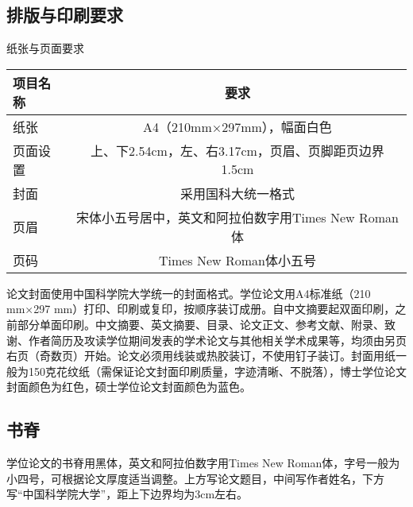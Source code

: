 \subsection{排版与印刷要求}
纸张与页面要求
\begin{center}
    \begin{tabular}{lc}
        \hline
        项目名称 & 要求\\
        \hline
        纸张&A4（210mm×297mm），幅面白色\\
        页面设置&上、下2.54cm，左、右3.17cm，页眉、页脚距页边界1.5cm\\
        封面&采用国科大统一格式\\
        页眉&宋体小五号居中，英文和阿拉伯数字用Times New Roman体\\
        页码&Times New Roman体小五号 \\

        \hline
    \end{tabular}
\end{center}
论文封面使用中国科学院大学统一的封面格式。学位论文用A4标准纸（210 mm×297 mm）打印、印刷或复印，按顺序装订成册。自中文摘要起双面印刷，之前部分单面印刷。中文摘要、英文摘要、目录、论文正文、参考文献、附录、致谢、作者简历及攻读学位期间发表的学术论文与其他相关学术成果等，均须由另页右页（奇数页）开始。论文必须用线装或热胶装订，不使用钉子装订。封面用纸一般为150克花纹纸（需保证论文封面印刷质量，字迹清晰、不脱落），博士学位论文封面颜色为红色，硕士学位论文封面颜色为蓝色。

\subsection{书脊}
学位论文的书脊用黑体，英文和阿拉伯数字用Times New Roman体，字号一般为小四号，可根据论文厚度适当调整。上方写论文题目，中间写作者姓名，下方写“中国科学院大学”，距上下边界均为3cm左右。
